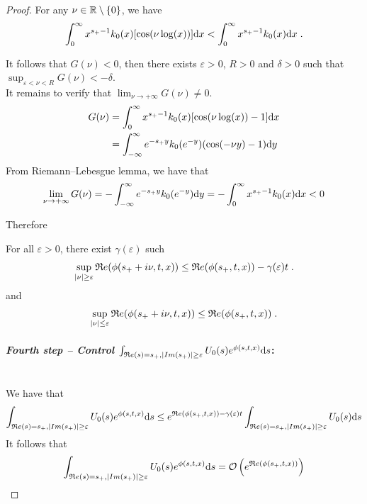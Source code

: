 \documentclass[11pt]{amsart}
\renewcommand{\Re}{\mathfrak{R}e}
\begin{document}
\begin{proof}
For any $\nu \in \mathbb{R} \setminus \{0\}$, we have
\begin{equation}
 \int_0^\infty x^{s_+ - 1}k_0(x) [\cos(\nu \log(x))] \mathrm dx < \int_0^\infty x^{s_+ - 1}k_0(x) \mathrm dx
 \; .
\end{equation}

It follows that $G(\nu) < 0$, then there exists $\varepsilon > 0$, $R >0$ and $\delta > 0$
such that $\sup_{\varepsilon < \nu < R}G(\nu) < - \delta$.\\

It remains to verify that $\lim_{\nu \to +\infty}G(\nu) \neq 0$. 
\begin{align*}
    G(\nu) 
    &=  \int_0^\infty x^{s_+ - 1}k_0(x) [\cos(\nu \log(x))- 1] \mathrm dx \\
    &=  \int_{-\infty}^\infty e^{-s_+ y}k_0(e^{-y})(\cos(-\nu y) - 1 )\mathrm dy
    \end{align*}
From Riemann–Lebesgue lemma, we have that 
\begin{equation}
    \lim_{\nu \to +\infty}G(\nu) = - \int_{-\infty}^\infty e^{-s_+ y}k_0(e^{-y})\mathrm dy = - \int_{0}^\infty x^{s_+ - 1}k_0(x)\mathrm dx < 0
\end{equation}

Therefore
\begin{lemma} For all $\varepsilon > 0$, there exist $\gamma(\varepsilon)$ such
\begin{equation}
    \sup_{|\nu| \geq \varepsilon } \Re(\phi(s_+ + i \nu, t, x)) \leq \Re(\phi(s_+, t, x)) - \gamma(\varepsilon)t
    \eqfinp
\end{equation}
and
\begin{equation}
    \sup_{|\nu| \leq \varepsilon } \Re(\phi(s_+ + i \nu, t, x)) \leq \Re(\phi(s_+, t, x))
    \eqfinp
\end{equation}
\end{lemma}

\medskip
\paragraph{\textit{Fourth step -- Control $\int_{\Re(s) = s_+, |Im(s_+)| \geq \varepsilon} U_0(s) e^{\phi(s, t, x)} \ds$}:}\mbox{}\\
We have that 
\begin{align*}
    \int_{\Re(s) = s_+, |Im(s_+)| \geq \varepsilon} U_0(s) e^{\phi(s, t, x)}
    \ds 
    &\leq  e^{\Re(\phi(s_+, t, x)) - \gamma(\varepsilon)t} \int_{\Re(s) = s_+, |Im(s_+)| \geq \varepsilon} U_0(s) \ds \\
\end{align*}
It follows that 
\begin{align*}
    \int_{\Re(s) = s_+, |Im(s_+)| \geq \varepsilon} U_0(s) e^{\phi(s, t, x)} 
    \ds = \Ocal \left( e^{\Re(\phi(s_+, t, x))} \right)
\end{align*}
\end{proof}
\end{document}
